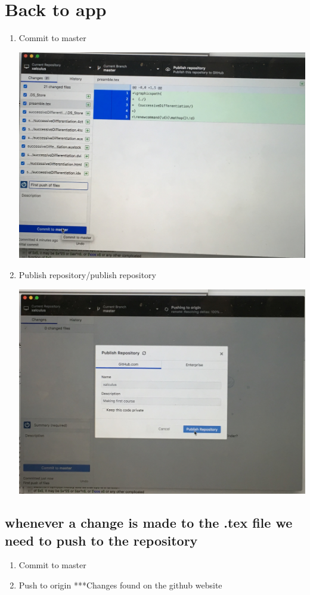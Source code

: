 \documentclass{ximera}
\begin{document}
\section{Back to app}
\begin{enumerate}
\item Commit to master
\begin{center}
\includegraphics[scale=.09]{images/x2}
\end{center}
\item Publish repository/publish repository   
\begin{center}
\includegraphics[scale=.09]{images/x3}
\end{center}
\end{enumerate}

\subsection{whenever a change is made to the .tex file we need to push to the repository}
\begin{enumerate}
\item Commit to master
\item Push to origin ***Changes found on the github website
\end{enumerate}
\end{document}

